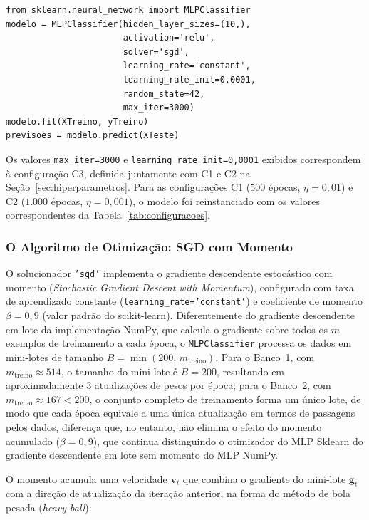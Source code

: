 \begin{lstlisting}[caption={Instanciação e treinamento do MLP com biblioteca (MLPClassifier).}, label={lst:mlp_sklearn}]
from sklearn.neural_network import MLPClassifier
modelo = MLPClassifier(hidden_layer_sizes=(10,),
                       activation='relu',
                       solver='sgd',
                       learning_rate='constant',
                       learning_rate_init=0.0001,
                       random_state=42,
                       max_iter=3000)
modelo.fit(XTreino, yTreino)
previsoes = modelo.predict(XTeste)
\end{lstlisting}

{\sloppy Os valores \texttt{max\_iter=3000} e \texttt{learning\_rate\_init=0,0001} exibidos correspondem à configuração C3, definida juntamente com C1 e C2 na Seção~\ref{sec:hiperparametros}. Para as configurações C1 ($500$ épocas, $\eta = 0{,}01$) e C2 ($1.000$ épocas, $\eta = 0{,}001$), o modelo foi reinstanciado com os valores correspondentes da Tabela~\ref{tab:configuracoes}.\par}

\subsubsection{O Algoritmo de Otimização: SGD com Momento}

O solucionador \texttt{'sgd'} implementa o gradiente descendente estocástico com momento (\textit{Stochastic Gradient Descent with Momentum}), configurado com taxa de aprendizado constante (\texttt{learning\_rate='constant'}) e coeficiente de momento $\beta = 0{,}9$ (valor padrão do scikit-learn). Diferentemente do gradiente descendente em lote da implementação NumPy, que calcula o gradiente sobre todos os $m$ exemplos de treinamento a cada época, o \texttt{MLPClassifier} processa os dados em mini-lotes de tamanho $B = \min(200,\, m_{\text{treino}})$. Para o Banco~1, com $m_{\text{treino}} \approx 514$, o tamanho do mini-lote é $B = 200$, resultando em aproximadamente 3 atualizações de pesos por época; para o Banco~2, com $m_{\text{treino}} \approx 167 < 200$, o conjunto completo de treinamento forma um único lote, de modo que cada época equivale a uma única atualização em termos de passagens pelos dados, diferença que, no entanto, não elimina o efeito do momento acumulado ($\beta = 0{,}9$), que continua distinguindo o otimizador do MLP Sklearn do gradiente descendente em lote sem momento do MLP NumPy.

O momento acumula uma velocidade $\mathbf{v}_t$ que combina o gradiente do mini-lote $\mathbf{g}_t$ com a direção de atualização da iteração anterior, na forma do método de bola pesada (\textit{heavy ball}):

